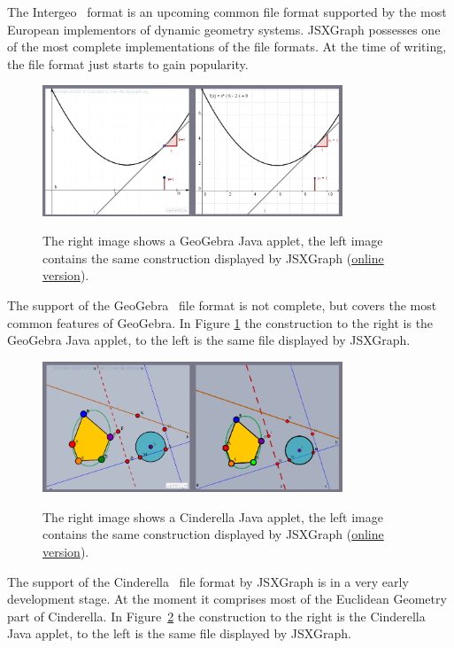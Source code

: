 \documentclass[12pt,a4paper]{article}%
\begin{document}
The Intergeo~\cite{kortenkamp2009} format is an upcoming common file format supported by the most European implementors of dynamic geometry systems. JSXGraph possesses one of the most complete implementations of the file formats. At the time of writing, the file format just starts to gain popularity. 

\begin{figure}[ht]
\begin{center}
\includegraphics[width=0.8\textwidth]{geogebra.png}\\
\caption{The right image shows a GeoGebra Java applet, 
the left image contains the same construction displayed 
by JSXGraph
(\href{http://jsxgraph.uni-bayreuth.de/talks/cadgme10/talk/jsx_ggb.html}{online version}).}\label{fig:geogebra}
\end{center}
\end{figure}
The support of the GeoGebra~\cite{hohenwarter2005} file format is not complete, 
but covers the most common features of GeoGebra. 
In Figure \ref{fig:geogebra} the construction to the right is the GeoGebra Java applet, 
to the left is the same file displayed by JSXGraph.


\begin{figure}[ht]
\begin{center}
\includegraphics[width=0.8\textwidth]{cindy.png}\\
\caption{The right image shows a Cinderella Java applet, 
the left image contains the same construction displayed 
by JSXGraph 
(\href{http://jsxgraph.uni-bayreuth.de/talks/cadgme10/talk/jsx_cdy.html}{online version}).}\label{fig:cindy}
\end{center}
\end{figure}
The support of the Cinderella~\cite{kortenkamp1999} file format \cite{kortenkamp1999} by JSXGraph is in a very early development stage. At the moment it comprises most of the Euclidean Geometry part of Cinderella. In Figure~\ref{fig:cindy} the construction to the right is the Cinderella Java applet, to the left is the same file displayed by JSXGraph.
\end{document}
